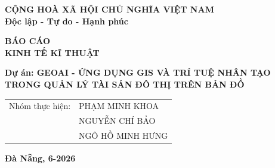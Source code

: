 \begin{titlepage}
    \begin{center}
        \textbf{\fontsize{15pt}{0pt}\selectfont CỘNG HOÀ XÃ HỘI CHỦ NGHĨA VIỆT NAM\\} 
        \textbf{\fontsize{15pt}{0pt}\selectfont Độc lập - Tự do - Hạnh phúc\\}
    \end{center}
    
    \vspace{4.5cm}
    
    \begin{center}
        \textbf{\fontsize{20pt}{0pt}\selectfont BÁO CÁO\\}
        \vspace{0.2cm}
        \textbf{\fontsize{20pt}{0pt}\selectfont KINH TẾ KĨ THUẬT\\}
    \end{center}
    
    \vspace{2cm}
    
    \begin{center}
        \textbf{\fontsize{20pt}{0pt}\selectfont Dự án: GEOAI - ỨNG DỤNG GIS VÀ TRÍ TUỆ NHÂN TẠO\\
TRONG QUẢN LÝ TÀI SẢN ĐÔ THỊ TRÊN BẢN ĐỒ\\}
       
        \vspace{3cm}
       
        \begin{table}[H]
            \centering
            \begin{tabular}{l l}
                \fontsize{14pt}{0pt}\selectfont Nhóm thực hiện:& \fontsize{14pt}{0pt}\selectfont PHẠM MINH KHOA\\
                & \fontsize{14pt}{0pt}\selectfont NGUYỄN CHÍ BẢO \\
                & \fontsize{14pt}{0pt}\selectfont NGÔ HỒ MINH HƯNG \\
            \end{tabular}
        \end{table}
    \end{center}
        
    \vfill 
    
    \begin{center}
        \textbf{\fontsize{14pt}{0pt}\selectfont Đà Nẵng, 6-2026}
    \end{center}

\end{titlepage}
\cleardoublepage
